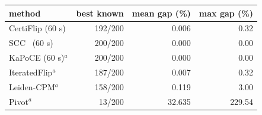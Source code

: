 \begin{tabular}{lrrr}
\toprule
method & best known & mean gap (\%) & max gap (\%) \\
\midrule
CertiFlip (60 s) & 192/200 & 0.006 & 0.32 \\
SCC~\cite{hausberger2025scc} (60 s) & 200/200 & 0.000 & 0.00 \\
KaPoCE (60 s)$^a$ & 200/200 & 0.000 & 0.00 \\
IteratedFlip$^a$ & 187/200 & 0.007 & 0.32 \\
Leiden-CPM$^a$ & 158/200 & 0.119 & 3.00 \\
Pivot$^a$ & 13/200 & 32.635 & 229.54 \\
\bottomrule
\end{tabular}
